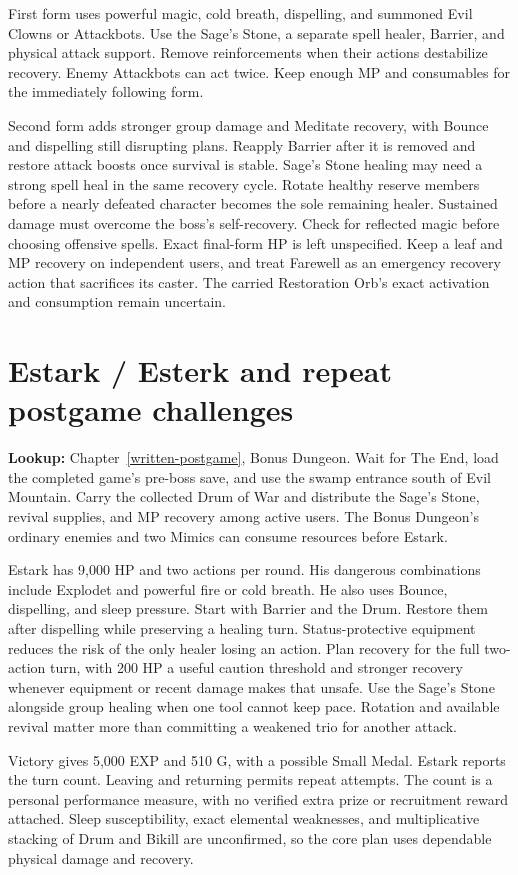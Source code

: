 First form uses powerful magic, cold breath, dispelling, and summoned Evil Clowns or Attackbots. Use the Sage's Stone, a separate spell healer, Barrier, and physical attack support. Remove reinforcements when their actions destabilize recovery. Enemy Attackbots can act twice. Keep enough MP and consumables for the immediately following form.

Second form adds stronger group damage and Meditate recovery, with Bounce and dispelling still disrupting plans. Reapply Barrier after it is removed and restore attack boosts once survival is stable. Sage's Stone healing may need a strong spell heal in the same recovery cycle. Rotate healthy reserve members before a nearly defeated character becomes the sole remaining healer. Sustained damage must overcome the boss's self-recovery. Check for reflected magic before choosing offensive spells. Exact final-form HP is left unspecified. Keep a leaf and MP recovery on independent users, and treat Farewell as an emergency recovery action that sacrifices its caster. The carried Restoration Orb's exact activation and consumption remain uncertain.

\section{Estark / Esterk and repeat postgame challenges}
\textbf{Lookup:} Chapter~\ref{written-postgame}, Bonus Dungeon. Wait for The End, load the completed game's pre-boss save, and use the swamp entrance south of Evil Mountain. Carry the collected Drum of War and distribute the Sage's Stone, revival supplies, and MP recovery among active users. The Bonus Dungeon's ordinary enemies and two Mimics can consume resources before Estark.

Estark has 9,000 HP and two actions per round. His dangerous combinations include Explodet and powerful fire or cold breath. He also uses Bounce, dispelling, and sleep pressure. Start with Barrier and the Drum. Restore them after dispelling while preserving a healing turn. Status-protective equipment reduces the risk of the only healer losing an action. Plan recovery for the full two-action turn, with 200 HP a useful caution threshold and stronger recovery whenever equipment or recent damage makes that unsafe. Use the Sage's Stone alongside group healing when one tool cannot keep pace. Rotation and available revival matter more than committing a weakened trio for another attack.

Victory gives 5,000 EXP and 510 G, with a possible Small Medal. Estark reports the turn count. Leaving and returning permits repeat attempts. The count is a personal performance measure, with no verified extra prize or recruitment reward attached. Sleep susceptibility, exact elemental weaknesses, and multiplicative stacking of Drum and Bikill are unconfirmed, so the core plan uses dependable physical damage and recovery.

